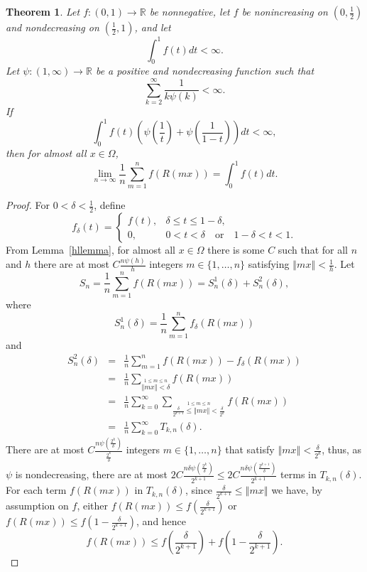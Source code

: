 \documentclass{article}
\newcommand{\norm}[1]{\left\Vert #1 \right\Vert}
\newtheorem{theorem}{Theorem}
\begin{document}
\begin{theorem}
Let $f:(0,1) \to \mathbb{R}$ be  nonnegative, let $f$ be nonincreasing on $(0,\frac{1}{2})$ and nondecreasing on $(\frac{1}{2},1)$, and let
\[
\int_0^1 f(t) dt < \infty.
\] 
Let $\psi:(1,\infty) \to \mathbb{R}$ be a positive and nondecreasing function such that
\[
\sum_{k=2}^\infty \frac{1}{k\psi(k)} < \infty.
\]
If
\[
\int_0^1 f(t) \left( \psi\left(\frac{1}{t}\right)+\psi\left(\frac{1}{1-t}\right) \right) dt<\infty,
\]
then for almost all $x \in \Omega$,
\[
\lim_{n \to \infty} \frac{1}{n} \sum_{m=1}^n f(R(mx))= \int_0^1 f(t)dt.
\]
\label{fpsi}
\end{theorem}
\begin{proof}
For $0<\delta<\frac{1}{2}$, define 
\[
f_\delta(t)=\begin{cases}f(t),&\delta\leq t \leq 1-\delta,\\
0,&0<t < \delta \quad \textrm{or} \quad 1-\delta < t<1.
\end{cases}
\]
From Lemma~\ref{hllemma}, for almost all $x \in \Omega$ there is some $C$ such that for all $n$ and $h$ there are at most
$C\frac{n\psi(h)}{h}$ integers $m \in \{1,\ldots,n\}$ satisfying $\norm{mx} < \frac{1}{h}$.
Let
\[
S_n=\frac{1}{n}\sum_{m=1}^n f(R(mx))=S_n^1(\delta)+S_n^2(\delta),
\]
where
\[
S_n^1(\delta)=\frac{1}{n}\sum_{m=1}^n f_\delta(R(mx))
\]
and
\begin{eqnarray*}
S_n^2(\delta)&=&\frac{1}{n}\sum_{m=1}^n f(R(mx))-f_\delta(R(mx))\\
&=&\frac{1}{n}\sum_{\stackrel{1 \leq m \leq n}{\norm{mx} < \delta}} f(R(mx))\\
&=&\frac{1}{n}\sum_{k=0}^\infty \sum_{\stackrel{1 \leq m \leq n}{\frac{\delta}{2^{k+1}} \leq \norm{mx} < \frac{\delta}{2^k}}} f(R(mx))\\
&=&\frac{1}{n} \sum_{k=0}^\infty T_{k,n}(\delta).
\end{eqnarray*}
There are at most $C\frac{n\psi\left( \frac{2^k}{\delta} \right)}{\frac{2^k}{\delta}}$ integers $m \in \{1, \ldots, n\}$ that satisfy 
$\norm{mx} < \frac{\delta}{2^k}$, thus, as $\psi$ is nondecreasing, there are at most $2C\frac{n\delta\psi\left( \frac{2^k}{\delta} \right)}{2^{k+1}} \leq 2C \frac{n\delta \psi\left( \frac{2^{k+1}}{\delta} \right)}{2^{k+1}}$ 
terms in $T_{k,n}(\delta)$. 
For each term $f(R(mx))$ in $T_{k,n}(\delta)$, since $\frac{\delta}{2^{k+1}} \leq \norm{mx}$ we have, by assumption on $f$, either $f(R(mx)) \leq f\left( \frac{\delta}{2^{k+1}} \right)$ or
$f(R(mx)) \leq f\left(1-  \frac{\delta}{2^{k+1}} \right)$, and hence 
\[
f(R(mx)) \leq f\left( \frac{\delta}{2^{k+1}} \right) + f\left(1-  \frac{\delta}{2^{k+1}} \right).
\]
\end{proof}
\end{document}
